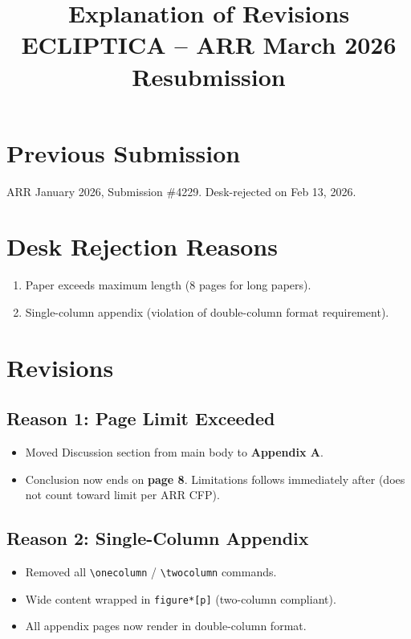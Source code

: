 \documentclass[11pt]{article}
\title{Explanation of Revisions\\{\large ECLIPTICA -- ARR March 2026 Resubmission}}
\author{}
\date{}
\begin{document}
\maketitle
\thispagestyle{empty}

\section*{Previous Submission}
ARR January 2026, Submission \#4229. Desk-rejected on Feb 13, 2026.

\section*{Desk Rejection Reasons}
\begin{enumerate}
    \item Paper exceeds maximum length (8 pages for long papers).
    \item Single-column appendix (violation of double-column format requirement).
\end{enumerate}

\section*{Revisions}

\subsection*{Reason 1: Page Limit Exceeded}
\begin{itemize}[leftmargin=*]
    \item Moved Discussion section from main body to \textbf{Appendix A}.
    \item Conclusion now ends on \textbf{page 8}. Limitations follows immediately after (does not count toward limit per ARR CFP).
\end{itemize}

\subsection*{Reason 2: Single-Column Appendix}
\begin{itemize}[leftmargin=*]
    \item Removed all \texttt{\textbackslash onecolumn} / \texttt{\textbackslash twocolumn} commands.
    \item Wide content wrapped in \texttt{figure*[p]} (two-column compliant).
    \item All appendix pages now render in double-column format.
\end{itemize}
\end{document}
